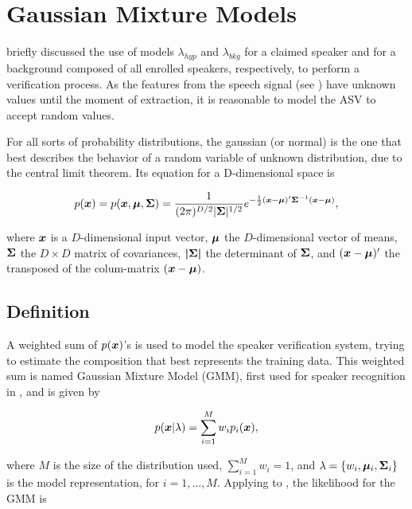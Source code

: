 \chapter{Gaussian Mixture Models}
\label{ch:gmm}

 briefly discussed the use of models $\lambda_{hyp}$ and $\lambda_{bkg}$ for a claimed speaker and for a background composed of all enrolled speakers, respectively, to perform a verification process. As the features from the speech signal (see ) have unknown values until the moment of extraction, it is reasonable to model the ASV to accept random values.

For all sorts of probability distributions, the gaussian (or normal) is the one that best describes the behavior of a random variable of unknown distribution, due to the central limit theorem. Its equation for a D-dimensional space is

\begin{equation}
    \pdf{\dvec{x}} = p(\dvec{x},\dvec{\mu},\dvec{\Sigma}) = \dgaussian{x}{\mu}{\Sigma},
    \label{eq:gaussian}
\end{equation}

\noindent where $\boldsymbol{x}$ is a $D$-dimensional input vector, $\boldsymbol{\mu}$ the $D$-dimensional vector of means, $\boldsymbol{\Sigma}$ the $D \times D$ matrix of covariances, $\boldsymbol{|\Sigma|}$ the determinant of $\boldsymbol{\Sigma}$, and $(\boldsymbol{x} - \boldsymbol{\mu})'$ the transposed of the colum-matrix $(\boldsymbol{x} - \boldsymbol{\mu})$.

\section{Definition}
\label{sec:gmm-definition}

A weighted sum of $p(\boldsymbol{x})$'s is used to model the speaker verification system, trying to estimate the composition that best represents the training data. This weighted sum is named Gaussian Mixture Model (GMM), first used for speaker recognition in , and is given by

\begin{equation}
    \postpdf{\dvec{x}}{\lambda} = \sum_{i=1}^M w_i\pdfi{\dvec{x}},
    \label{eq:gaussian_mixture}
\end{equation}

\noindent where $M$ is the size of the distribution used, $\sum_{i=1}^M w_i = 1$, and $\lambda = \{w_i, \boldsymbol{\mu}_i, \boldsymbol{\Sigma}_i\}$ is the model representation, for $i = 1, ..., M$. Applying  to , the likelihood for the GMM is

